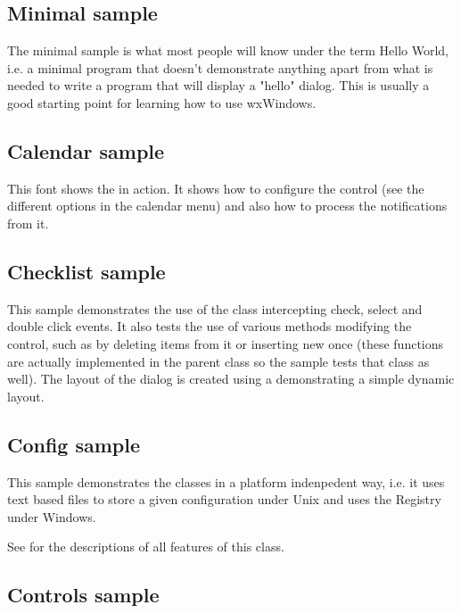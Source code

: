 \subsection{Minimal sample}\label{sampleminimal}

The minimal sample is what most people will know under the term Hello World,
i.e. a minimal program that doesn't demonstrate anything apart from what is
needed to write a program that will display a "hello" dialog. This is usually
a good starting point for learning how to use wxWindows.

\subsection{Calendar sample}\label{samplecalendar}

This font shows the  in action. It
shows how to configure the control (see the different options in the calendar
menu) and also how to process the notifications from it.

\subsection{Checklist sample}\label{samplechecklist}

This sample demonstrates the use of the 
class intercepting check, select and double click events. It also tests the
use of various methods modifying the control, such as by deleting items
from it or inserting new once (these functions are actually implemented in
the parent class  so the sample tests that class
as well). The layout of the dialog is created using a 
demonstrating a simple dynamic layout.

\subsection{Config sample}\label{sampleconfig}

This sample demonstrates the  classes in a platform
indenpedent way, i.e. it uses text based files to store a given configuration under
Unix and uses the Registry under Windows.

See  for the descriptions of all
features of this class.

\subsection{Controls sample}\label{samplecontrols}

